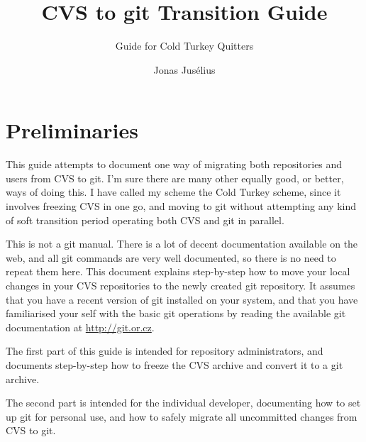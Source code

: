 \documentclass[a4paper,10pt]{article}
\begin{document}
\pagestyle{fancy}
\fancyfoot{}
\fancyhead{}
\renewcommand{\sectionmark}[1]{\markboth{\sf\thesection.\ #1}{}}
\renewcommand{\subsectionmark}[1]{}
\fancyhead[R]{{\rmfamily\thepage}}

\title{CVS to git Transition Guide}

\subtitle{Guide for Cold Turkey Quitters}
\author{{\sf Jonas Jus\'elius}}
\address{
{\tt <jonas.juselius@chem.uit.no>}\\
{\sf University of Tromsø}\\
{\sf Department of Chemistry}\\
{\sf N-9037 University of Tromsø, Norway}
}

\maketitle

\section{Preliminaries}
This guide attempts to document one way of migrating both repositories and 
users from  CVS to git. 
I'm sure there are many other equally good, or better, ways of doing 
this. I have called my scheme the Cold Turkey scheme, since it involves
freezing CVS in one go, and moving to git without attempting any kind of soft
transition period operating both CVS and git in parallel. 

This is not a git manual. There is a lot of decent
documentation available on the web, and all git commands are very well
documented, so there is no need to repeat them here. 
This document explains step-by-step how to move your local changes
in your CVS repositories to the newly created git repository. It assumes that
you have a recent version of git installed on your system, and that you have
familiarised your self with the basic git operations by reading the available
git documentation at \url{http://git.or.cz}. 

The first part of this guide is intended for repository administrators, and
documents step-by-step how to freeze the CVS archive and convert it to a git
archive. 

The second part is intended for the individual developer, documenting how to
set up git for personal use, and how to safely migrate all uncommitted changes
from CVS to git.
\end{document}
